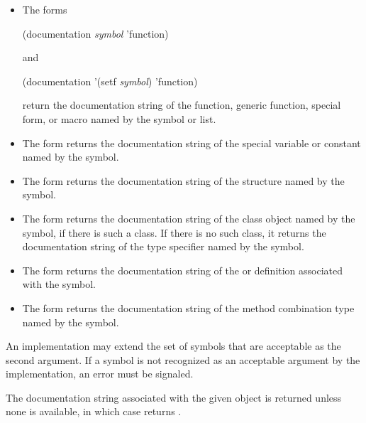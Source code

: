 \begin{defun}
\begin{itemize}
\begin{itemize}
\item
The forms
\begin{lisp}
(documentation \emph{symbol\/} 'function)
\end{lisp}
and
\begin{lisp}
(documentation '(setf \emph{symbol\/}) 'function)
\end{lisp}
return the
documentation string of the function, generic function, special form, or
macro named by the symbol or list.

\item
The form  returns the
documentation string of the special variable or constant named by the
symbol.

\item
The form  returns the
documentation string of the  structure named by the
symbol.

\item
The form  returns the documentation
string of the class object named by the symbol, if there is such a
class.   If there is no such class, it returns the documentation string
of the type specifier named by the symbol. 

\item
The form  returns the documentation
string of the  or  definition
associated with the symbol.

\item
The form  returns the
documentation string of the method combination type named by the
symbol.  
\end{itemize}

\end{itemize}

An implementation may extend the set of symbols that are acceptable as
the second argument.  If a symbol is not recognized as an acceptable
argument by the implementation, an error must be signaled.


The documentation string associated with the given object is returned
unless none is available, in which case  returns
.

\end{defun}


